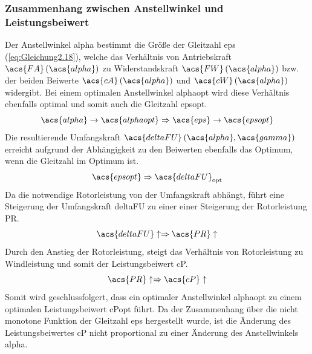 \subsubsection{Zusammenhang zwischen Anstellwinkel und Leistungsbeiwert}
Der Anstellwinkel \acs{alpha} bestimmt die Größe der Gleitzahl \acs{eps} (\autoref{eq:Gleichung2.18}), welche das Verhältnis von Antriebskraft $\acs{FA}\left(\acs{alpha}\right)$ zu Widerstandskraft $\acs{FW}\left(\acs{alpha}\right)$ bzw. der beiden Beiwerte $\acs{cA}\left(\acs{alpha}\right)$ und $\acs{cW}\left(\acs{alpha}\right)$ widergibt. Bei einem optimalen Anstellwinkel \acs{alphaopt} wird diese Verhältnis ebenfalls optimal und somit auch die Gleitzahl \acs{epsopt}.
\begin{equation*}
    \acs{alpha} \rightarrow \acs{alphaopt} \Rightarrow \acs{eps} \rightarrow \acs{epsopt}
\end{equation*}
\newline
Die resultierende Umfangskraft $\acs{deltaFU}\left(\acs{alpha}, \acs{gamma}\right)$ erreicht aufgrund der Abhängigkeit zu den Beiwerten ebenfalls das Optimum, wenn die Gleitzahl im Optimum ist.
\begin{equation*}
    \acs{epsopt} \Rightarrow \acs{deltaFU}_{\mathrm{opt}}
\end{equation*}
\newline
Da die notwendige Rotorleistung von der Umfangskraft abhängt, führt eine Steigerung der Umfangskraft \acs{deltaFU} zu einer einer Steigerung der Rotorleistung \acs{PR}.
\begin{equation*}
    \acs{deltaFU}\uparrow \Rightarrow \acs{PR}\uparrow
\end{equation*}
\newline
Durch den Anstieg der Rotorleistung, steigt das Verhältnis von Rotorleistung zu Windleistung und somit der Leistungsbeiwert \acs{cP}.
\begin{equation*}
    \acs{PR}\uparrow \Rightarrow \acs{cP}\uparrow
\end{equation*}
\newline
Somit wird geschlussfolgert, dass ein optimaler Anstellwinkel \acs{alphaopt} zu einem optimalen Leistungsbeiwert \acs{cPopt} führt. Da der Zusammenhang über die nicht monotone Funktion der Gleitzahl \acs{eps} hergestellt wurde, ist die Änderung des Leistungsbeiwertes \acs{cP} nicht proportional zu einer Änderung des Anstellwinkels \acs{alpha}.

